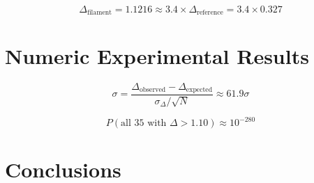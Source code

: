 \documentclass[11pt,a4paper]{article}
\begin{document}
\begin{equation}
\Delta_{\text{filament}} = 1.1216 \approx 3.4 \times \Delta_{\text{reference}} = 3.4 \times 0.327
\end{equation}

\section{Numeric Experimental Results}
\label{sec:numeric_results}

\begin{equation}
\sigma = \frac{\Delta_{\text{observed}} - \Delta_{\text{expected}}}{\sigma_{\Delta}/\sqrt{N}} \approx 61.9\sigma
\end{equation}

\begin{equation}
P(\text{all 35 with } \Delta > 1.10) \approx 10^{-280}
\end{equation}











\section{Conclusions}
\label{sec:conclusions}
\end{document}
